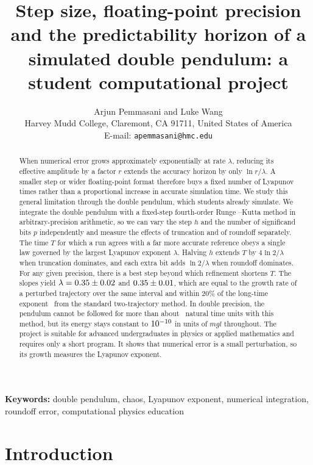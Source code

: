 \documentclass[12pt,a4paper]{article}
\title{Step size, floating-point precision and the predictability horizon of a
simulated double pendulum: a student computational project}
\author{Arjun Pemmasani and Luke Wang\\[4pt]
\small Harvey Mudd College, Claremont, CA 91711, United States of America\\
\small E-mail: \texttt{apemmasani@hmc.edu}}
\date{}
\begin{document}
\maketitle

\begin{abstract}
\noindent When numerical error grows approximately exponentially at rate
$\lambda$, reducing its effective amplitude by a factor $r$ extends the
accuracy horizon by only $\ln r/\lambda$. A smaller step or wider floating-point
format therefore buys a fixed number of Lyapunov times rather than a
proportional increase in accurate simulation time. We study this general
limitation through the double pendulum, which students already simulate.
We integrate the double pendulum with a fixed-step fourth-order Runge
--Kutta method in arbitrary-precision arithmetic, so we can vary the step $h$
and the number of significand bits $p$ independently and measure the effects of
truncation and of roundoff separately. The time $T$ for which a run agrees with
a far more accurate reference obeys a single law governed by the largest
Lyapunov exponent $\lambda$. Halving $h$ extends $T$ by $4\ln2/\lambda$ when truncation dominates,
and each extra bit adds $\ln2/\lambda$ when roundoff dominates. For any given
precision, there is a best step beyond which refinement shortens $T$. The slopes
yield $\lambda=0.35\pm0.02$ and $0.35\pm0.01$, which are
equal to the growth rate of a perturbed trajectory over the same interval and
within 20\% of the long-time exponent \lamBen\ from the standard two-trajectory
method. In double precision, the pendulum cannot be followed for more than about
\TBestDouble\ natural time units with this method, but its energy stays constant
to $10^{-10}$ in units of $mgl$ throughout. The project is suitable for
advanced undergraduates in physics or applied mathematics and requires only a
short program. It shows that numerical error is a small perturbation, so its
growth measures the Lyapunov exponent.
\end{abstract}

\noindent\textbf{Keywords:} double pendulum, chaos, Lyapunov exponent, numerical
integration, roundoff error, computational physics education

\section{Introduction}
\end{document}
